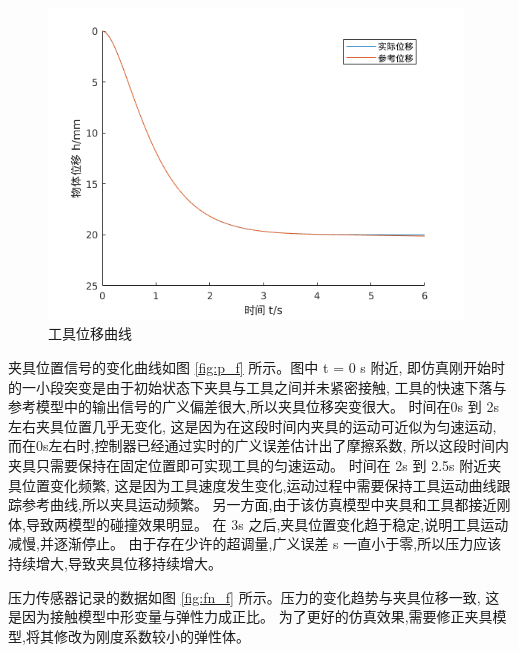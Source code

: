 \begin{figure}[!ht]
  \centering
  \includegraphics[width=11cm]{chapter04/pic/h_f}
  \caption{工具位移曲线}
  \label{fig:4-7}
  \vspace{-0.3cm}
\end{figure}


夹具位置信号的变化曲线如图 \ref{fig:p_f} 所示。图中 t = 0 s 附近,
即仿真刚开始时的一小段突变是由于初始状态下夹具与工具之间并未紧密接触,
工具的快速下落与参考模型中的输出信号的广义偏差很大,所以夹具位移突变很大。
时间在0s 到 2s左右夹具位置几乎无变化, 这是因为在这段时间内夹具的运动可近似为匀速运动,
而在0s左右时,控制器已经通过实时的广义误差估计出了摩擦系数,
所以这段时间内夹具只需要保持在固定位置即可实现工具的匀速运动。
时间在 2s 到 2.5s 附近夹具位置变化频繁,
这是因为工具速度发生变化,运动过程中需要保持工具运动曲线跟踪参考曲线,所以夹具运动频繁。
另一方面,由于该仿真模型中夹具和工具都接近刚体,导致两模型的碰撞效果明显。
在 3s 之后,夹具位置变化趋于稳定,说明工具运动减慢,并逐渐停止。
由于存在少许的超调量,广义误差 s 一直小于零,所以压力应该持续增大,导致夹具位移持续增大。


压力传感器记录的数据如图 \ref{fig:fn_f} 所示。压力的变化趋势与夹具位移一致,
这是因为接触模型中形变量与弹性力成正比。
为了更好的仿真效果,需要修正夹具模型,将其修改为刚度系数较小的弹性体。

